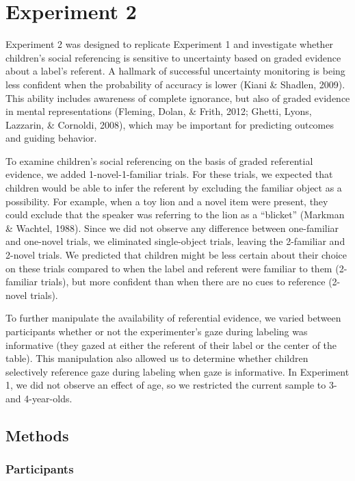 \documentclass[a4paper,man,apacite,floatsintext]{apa6}
\begin{document}
\section{Experiment 2}\label{experiment-2}

Experiment 2 was designed to replicate Experiment 1 and investigate
whether children's social referencing is sensitive to uncertainty based
on graded evidence about a label's referent. A hallmark of successful
uncertainty monitoring is being less confident when the probability of
accuracy is lower (Kiani \& Shadlen, 2009). This ability includes
awareness of complete ignorance, but also of graded evidence in mental
representations (Fleming, Dolan, \& Frith, 2012; Ghetti, Lyons,
Lazzarin, \& Cornoldi, 2008), which may be important for predicting
outcomes and guiding behavior.

To examine children's social referencing on the basis of graded
referential evidence, we added 1-novel-1-familiar trials. For these
trials, we expected that children would be able to infer the referent by
excluding the familiar object as a possibility. For example, when a toy
lion and a novel item were present, they could exclude that the speaker
was referring to the lion as a ``blicket'' (Markman \& Wachtel, 1988).
Since we did not observe any difference between one-familiar and
one-novel trials, we eliminated single-object trials, leaving the
2-familiar and 2-novel trials. We predicted that children might be less
certain about their choice on these trials compared to when the label
and referent were familiar to them (2-familiar trials), but more
confident than when there are no cues to reference (2-novel trials).

To further manipulate the availability of referential evidence, we
varied between participants whether or not the experimenter's gaze
during labeling was informative (they gazed at either the referent of
their label or the center of the table). This manipulation also allowed
us to determine whether children selectively reference gaze during
labeling when gaze is informative. In Experiment 1, we did not observe
an effect of age, so we restricted the current sample to 3- and
4-year-olds.

\subsection{Methods}\label{methods-1}

\subsubsection{Participants}\label{participants-1}
\end{document}
